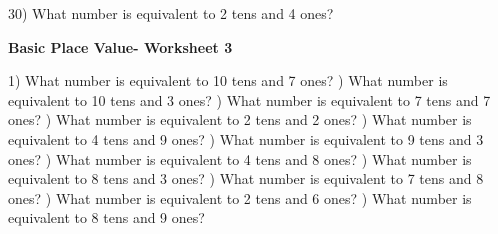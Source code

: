 \documentclass{article}%
\begin{document}
30) What number is equivalent to 2 tens and 4 ones?%
\newline%
\newline%
\newline%
\pagebreak%
\large%
\begin{center}%
\textbf{Basic Place Value- Worksheet 3}%
\newline%
\end{center} \normalsize%
1) What number is equivalent to 10 tens and 7 ones?%
\newline%
\newline%
) What number is equivalent to 10 tens and 3 ones?%
\newline%
\newline%
) What number is equivalent to 7 tens and 7 ones?%
\newline%
\newline%
) What number is equivalent to 2 tens and 2 ones?%
\newline%
\newline%
) What number is equivalent to 4 tens and 9 ones?%
\newline%
\newline%
) What number is equivalent to 9 tens and 3 ones?%
\newline%
\newline%
) What number is equivalent to 4 tens and 8 ones?%
\newline%
\newline%
) What number is equivalent to 8 tens and 3 ones?%
\newline%
\newline%
) What number is equivalent to 7 tens and 8 ones?%
\newline%
\newline%
) What number is equivalent to 2 tens and 6 ones?%
\newline%
\newline%
) What number is equivalent to 8 tens and 9 ones?%
\newline%
\newline%
\end{document}
